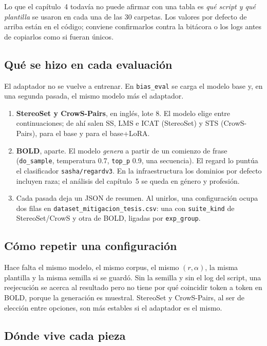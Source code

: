 \documentclass[11pt,a4paper]{article}
\newcommand{\archivo}[1]{\texttt{\nolinkurl{#1}}}
\begin{document}
\noindent
Lo que el capítulo~4 todavía no puede afirmar con una tabla es \emph{qué script y qué plantilla}
se usaron en cada una de las 30 carpetas. Los valores por defecto de arriba están en el código;
conviene confirmarlos contra la bitácora o los logs antes de copiarlos como si fueran únicos.

\subsection{Qué se hizo en cada evaluación}

El adaptador no se vuelve a entrenar. En \archivo{bias\_eval} se carga el modelo base y, en una segunda
pasada, el mismo modelo más el adaptador.

\begin{enumerate}[leftmargin=*, itemsep=0.4em]
  \item \textbf{StereoSet y CrowS-Pairs}, en inglés, lote 8. El modelo elige entre continuaciones; de ahí
        salen SS, LMS e ICAT (StereoSet) y STS (CrowS-Pairs), para el base y para el base+LoRA.
  \item \textbf{BOLD}, aparte. El modelo \emph{genera} a partir de un comienzo de frase
        (\texttt{do\_sample}, temperatura 0.7, \texttt{top\_p} 0.9, una secuencia). El regard lo puntúa
        el clasificador \archivo{sasha/regardv3}. En la infraestructura los dominios por defecto incluyen
        raza; el análisis del capítulo~5 se queda en género y profesión.
  \item Cada pasada deja un JSON de resumen. Al unirlos, una configuración ocupa dos filas en
        \archivo{dataset\_mitigacion\_tesis.csv}: una con \texttt{suite\_kind} de StereoSet/CrowS y otra
        de BOLD, ligadas por \texttt{exp\_group}.
\end{enumerate}

\subsection{Cómo repetir una configuración}

Hace falta el mismo modelo, el mismo corpus, el mismo $(r,\alpha)$, la misma plantilla y la misma semilla
si se guardó. Sin la semilla y sin el log del script, una reejecución se acerca al resultado pero no tiene
por qué coincidir token a token en BOLD, porque la generación es muestral. StereoSet y CrowS-Pairs, al ser
de elección entre opciones, son más estables si el adaptador es el mismo.

\subsection{Dónde vive cada pieza}
\end{document}
